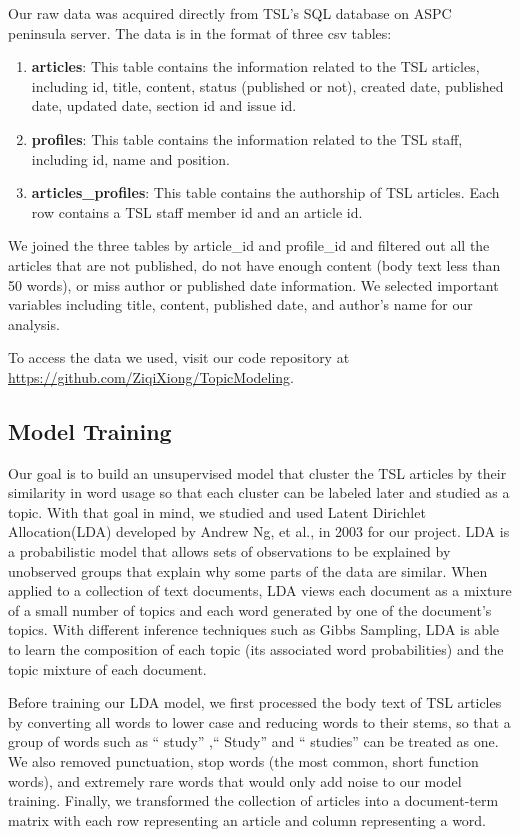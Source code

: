 \documentclass[a4paper]{article}
\begin{document}
Our raw data was acquired directly from TSL's SQL database on ASPC peninsula server. The data is in the format of three csv tables: 

\begin{enumerate}
\item \textbf{articles}: This table contains the information related to the TSL articles, including id, title, content, status (published or not), created date, published date, updated date, section id and issue id.
\item \textbf{profiles}: This table contains the information related to the TSL staff, including id, name and position.
\item \textbf{articles\_profiles}: This table contains the authorship of TSL articles. Each row contains a TSL staff member id and an article id.
\end{enumerate}

We joined the three tables by article\_id and profile\_id and filtered out all the articles that are not published, do not have enough content (body text less than 50 words), or miss author or published date information. We selected important variables including title, content, published date, and author's name for our analysis.

To access the data we used, visit our code repository at \href{https://github.com/ZiqiXiong/TopicModeling}{https://github.com/ZiqiXiong/TopicModeling}.

\subsection{Model Training}

Our goal is to build an unsupervised model that cluster the TSL articles by their similarity in word usage so that each cluster can be labeled later and studied as a topic. With that goal in mind, we studied and used Latent Dirichlet Allocation(LDA) developed by Andrew Ng, et al., in 2003 for our project. LDA is a probabilistic model that allows sets of observations to be explained by unobserved groups that explain why some parts of the data are similar. When applied to a collection of text documents, LDA views each document as a mixture of a small number of topics and each word generated by one of the document's topics. With different inference techniques such as Gibbs Sampling, LDA is able to learn the composition of each topic (its associated word probabilities) and the topic mixture of each document.

Before training our LDA model, we first processed the body text of TSL articles by converting all words to lower case and reducing words to their stems, so that a group of words such as `` study'' ,`` Study''  and `` studies''  can be treated as one. We also removed punctuation, stop words (the most common, short function words), and extremely rare words that would only add noise to our model training. Finally, we transformed the collection of articles into a document-term matrix with each row representing an article and column representing a word. 
\end{document}
